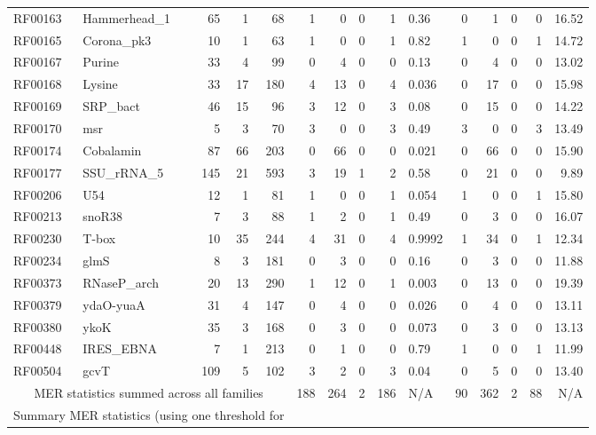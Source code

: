 \documentclass[11pt]{article}
\begin{document}
\begin{table}
\begin{center}
\begin{tabular}{|ll|rrr|rrrrl|rrrrr|}
RF00163 & Hammerhead\_1 & 65 & 1 & 68 & 1 & 0 & 0 & 1 &   0.36 & 0 & 1 & 0 & 0 &  16.52 \\  
RF00165 & Corona\_pk3 & 10 & 1 & 63 & 1 & 0 & 0 & 1 &   0.82 & 1 & 0 & 0 & 1 &  14.72 \\  
RF00167 & Purine & 33 & 4 & 99 & 0 & 4 & 0 & 0 &   0.13 & 0 & 4 & 0 & 0 &  13.02 \\  
RF00168 & Lysine & 33 & 17 & 180 & 4 & 13 & 0 & 4 &  0.036 & 0 & 17 & 0 & 0 &  15.98 \\  
RF00169 & SRP\_bact & 46 & 15 & 96 & 3 & 12 & 0 & 3 &   0.08 & 0 & 15 & 0 & 0 &  14.22 \\  
RF00170 & msr & 5 & 3 & 70 & 3 & 0 & 0 & 3 &   0.49 & 3 & 0 & 0 & 3 &  13.49 \\  
RF00174 & Cobalamin & 87 & 66 & 203 & 0 & 66 & 0 & 0 &  0.021 & 0 & 66 & 0 & 0 &   15.90 \\  
RF00177 & SSU\_rRNA\_5 & 145 & 21 & 593 & 3 & 19 & 1 & 2 &   0.58 & 0 & 21 & 0 & 0 &   9.89 \\  
RF00206 & U54 & 12 & 1 & 81 & 1 & 0 & 0 & 1 &  0.054 & 1 & 0 & 0 & 1 &   15.80 \\  
RF00213 & snoR38 & 7 & 3 & 88 & 1 & 2 & 0 & 1 &   0.49 & 0 & 3 & 0 & 0 &  16.07 \\  
RF00230 & T-box & 10 & 35 & 244 & 4 & 31 & 0 & 4 & 0.9992 & 1 & 34 & 0 & 1 &  12.34 \\  
RF00234 & glmS & 8 & 3 & 181 & 0 & 3 & 0 & 0 &   0.16 & 0 & 3 & 0 & 0 &  11.88 \\  
RF00373 & RNaseP\_arch & 20 & 13 & 290 & 1 & 12 & 0 & 1 &  0.003 & 0 & 13 & 0 & 0 &  19.39 \\  
RF00379 & ydaO-yuaA & 31 & 4 & 147 & 0 & 4 & 0 & 0 &  0.026 & 0 & 4 & 0 & 0 &  13.11 \\  
RF00380 & ykoK & 35 & 3 & 168 & 0 & 3 & 0 & 0 &  0.073 & 0 & 3 & 0 & 0 &  13.13 \\  
RF00448 & IRES\_EBNA & 7 & 1 & 213 & 0 & 1 & 0 & 0 &   0.79 & 1 & 0 & 0 & 1 &  11.99 \\  
RF00504 & gcvT & 109 & 5 & 102 & 3 & 2 & 0 & 3 &   0.04 & 0 & 5 & 0 & 0 &   13.40 \\ \hline 
\multicolumn{5}{|c|}{MER statistics summed across all families} & 188
& 264 & 2 & 186 & N/A & 90 & 362 & 2 & 88 & N/A \\  
\multicolumn{5}{|c|}{Summary MER statistics (using one threshold for
}
\end{tabular}
\end{center}
\end{table}
\end{document}
